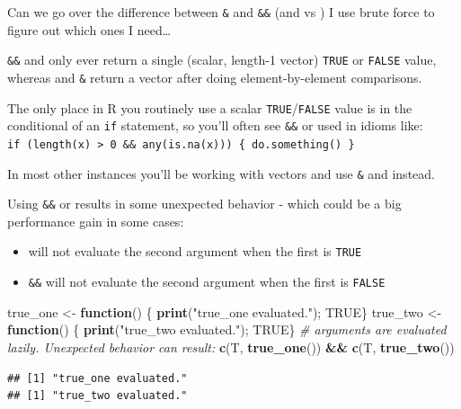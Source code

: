 \documentclass[]{book}
\newenvironment{Shaded}{\begin{snugshade}}{\end{snugshade}}
\newcommand{\CommentTok}[1]{\textcolor[rgb]{0.56,0.35,0.01}{\textit{#1}}}
\newcommand{\ControlFlowTok}[1]{\textcolor[rgb]{0.13,0.29,0.53}{\textbf{#1}}}
\newcommand{\KeywordTok}[1]{\textcolor[rgb]{0.13,0.29,0.53}{\textbf{#1}}}
\newcommand{\NormalTok}[1]{#1}
\newcommand{\OperatorTok}[1]{\textcolor[rgb]{0.81,0.36,0.00}{\textbf{#1}}}
\newcommand{\OtherTok}[1]{\textcolor[rgb]{0.56,0.35,0.01}{#1}}
\newcommand{\StringTok}[1]{\textcolor[rgb]{0.31,0.60,0.02}{#1}}
\providecommand{\tightlist}{%
  \setlength{\itemsep}{0pt}\setlength{\parskip}{0pt}}
\begin{document}
Can we go over the difference between \texttt{\&} and \texttt{\&\&} (and \texttt{\textbar{}} vs \texttt{\textbar{}\textbar{}}) I use brute force to figure out which ones I need\ldots{}

\texttt{\&\&} and \texttt{\textbar{}\textbar{}} only ever return a single (scalar, length-1 vector) \texttt{TRUE} or \texttt{FALSE} value, whereas \texttt{\textbar{}} and \texttt{\&} return a vector after doing element-by-element comparisons.

The only place in R you routinely use a scalar \texttt{TRUE}/\texttt{FALSE} value is in the conditional of an \texttt{if} statement, so you'll often see \texttt{\&\&} or \texttt{\textbar{}\textbar{}} used in idioms like: \texttt{if\ (length(x)\ \textgreater{}\ 0\ \&\&\ any(is.na(x)))\ \{\ do.something()\ \}}

In most other instances you'll be working with vectors and use \texttt{\&} and \texttt{\textbar{}} instead.

Using \texttt{\&\&} or \texttt{\textbar{}\textbar{}} results in some unexpected behavior - which could be a big performance gain in some cases:

\begin{itemize}
\tightlist
\item
  \texttt{\textbar{}\textbar{}} will not evaluate the second argument when the first is \texttt{TRUE}
\item
  \texttt{\&\&} will not evaluate the second argument when the first is \texttt{FALSE}
\end{itemize}

\begin{Shaded}
\begin{Highlighting}[]
\NormalTok{true_one <-}\StringTok{ }\ControlFlowTok{function}\NormalTok{() \{ }\KeywordTok{print}\NormalTok{(}\StringTok{"true_one evaluated."}\NormalTok{); }\OtherTok{TRUE}\NormalTok{\}}
\NormalTok{true_two <-}\StringTok{ }\ControlFlowTok{function}\NormalTok{() \{ }\KeywordTok{print}\NormalTok{(}\StringTok{"true_two evaluated."}\NormalTok{); }\OtherTok{TRUE}\NormalTok{\}}
\CommentTok{# arguments are evaluated lazily.  Unexpected behavior can result:}
\KeywordTok{c}\NormalTok{(T, }\KeywordTok{true_one}\NormalTok{()) }\OperatorTok{&&}\StringTok{ }\KeywordTok{c}\NormalTok{(T, }\KeywordTok{true_two}\NormalTok{())}
\end{Highlighting}
\end{Shaded}

\begin{verbatim}
## [1] "true_one evaluated."
## [1] "true_two evaluated."
\end{verbatim}
\end{document}
